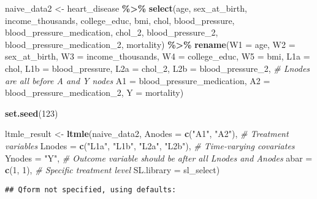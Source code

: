 \documentclass[
]{article}
\newenvironment{Shaded}{\begin{snugshade}}{\end{snugshade}}
\newcommand{\AttributeTok}[1]{\textcolor[rgb]{0.13,0.29,0.53}{#1}}
\newcommand{\CommentTok}[1]{\textcolor[rgb]{0.56,0.35,0.01}{\textit{#1}}}
\newcommand{\DecValTok}[1]{\textcolor[rgb]{0.00,0.00,0.81}{#1}}
\newcommand{\FunctionTok}[1]{\textcolor[rgb]{0.13,0.29,0.53}{\textbf{#1}}}
\newcommand{\NormalTok}[1]{#1}
\newcommand{\OtherTok}[1]{\textcolor[rgb]{0.56,0.35,0.01}{#1}}
\newcommand{\SpecialCharTok}[1]{\textcolor[rgb]{0.81,0.36,0.00}{\textbf{#1}}}
\newcommand{\StringTok}[1]{\textcolor[rgb]{0.31,0.60,0.02}{#1}}
\begin{document}
\begin{Shaded}
\begin{Highlighting}[]
\NormalTok{naive\_data2 }\OtherTok{\textless{}{-}}\NormalTok{ heart\_disease }\SpecialCharTok{\%\textgreater{}\%}
  \FunctionTok{select}\NormalTok{(age, sex\_at\_birth, income\_thousands, college\_educ, }
\NormalTok{         bmi, chol, blood\_pressure, }
\NormalTok{         blood\_pressure\_medication, chol\_2, blood\_pressure\_2, }
\NormalTok{         blood\_pressure\_medication\_2, mortality) }\SpecialCharTok{\%\textgreater{}\%}
  \FunctionTok{rename}\NormalTok{(}\AttributeTok{W1 =}\NormalTok{ age, }\AttributeTok{W2 =}\NormalTok{ sex\_at\_birth, }\AttributeTok{W3 =}\NormalTok{ income\_thousands, }
         \AttributeTok{W4 =}\NormalTok{ college\_educ, }\AttributeTok{W5 =}\NormalTok{ bmi, }\AttributeTok{L1a =}\NormalTok{ chol, }\AttributeTok{L1b =}\NormalTok{ blood\_pressure, }
         \AttributeTok{L2a =}\NormalTok{ chol\_2, }\AttributeTok{L2b =}\NormalTok{ blood\_pressure\_2,  }\CommentTok{\# Lnodes are all before A and Y nodes}
         \AttributeTok{A1 =}\NormalTok{ blood\_pressure\_medication, }
         \AttributeTok{A2 =}\NormalTok{ blood\_pressure\_medication\_2, }
         \AttributeTok{Y =}\NormalTok{ mortality)}

\FunctionTok{set.seed}\NormalTok{(}\DecValTok{123}\NormalTok{)}

\NormalTok{ltmle\_result }\OtherTok{\textless{}{-}} \FunctionTok{ltmle}\NormalTok{(naive\_data2,  }
                      \AttributeTok{Anodes =} \FunctionTok{c}\NormalTok{(}\StringTok{"A1"}\NormalTok{, }\StringTok{"A2"}\NormalTok{),  }\CommentTok{\# Treatment variables}
                      \AttributeTok{Lnodes =} \FunctionTok{c}\NormalTok{(}\StringTok{"L1a"}\NormalTok{, }\StringTok{"L1b"}\NormalTok{, }\StringTok{"L2a"}\NormalTok{, }\StringTok{"L2b"}\NormalTok{),  }\CommentTok{\# Time{-}varying covariates}
                      \AttributeTok{Ynodes =} \StringTok{"Y"}\NormalTok{,  }\CommentTok{\# Outcome variable should be after all Lnodes and Anodes}
                      \AttributeTok{abar =} \FunctionTok{c}\NormalTok{(}\DecValTok{1}\NormalTok{, }\DecValTok{1}\NormalTok{),  }\CommentTok{\# Specific treatment level}
                      \AttributeTok{SL.library =}\NormalTok{ sl\_select)}
\end{Highlighting}
\end{Shaded}

\begin{verbatim}
## Qform not specified, using defaults:
\end{verbatim}
\end{document}
